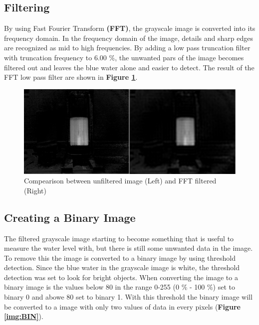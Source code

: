 \subsection{Filtering}
By using Fast Fourier Transform \textbf{(FFT)}, the grayscale image is converted into its frequency domain. In the frequency domain of the image, details and sharp edges are recognized as mid to high frequencies. By adding a low pass truncation filter with truncation frequency to 6.00 \%, the unwanted pars of the image becomes filtered out and leaves the blue water alone and easier to detect. The result of the FFT low pass filter are shown in \textbf{Figure \ref{img:FFTS}}.

\begin{figure}[b!]
	\centering
	\includegraphics[width=1\textwidth]{pictures/FFTS}
	\caption{Compearison between unfiltered image (Left) and FFT filtered (Right)}
	\label{img:FFTS}
\end{figure}


\subsection{Creating a Binary Image}
The filtered grayscale image starting to become something that is useful to measure the water level with, but there is still some unwanted data in the image. To remove this the image is converted to a binary image by using threshold detection. Since the blue water in the grayscale image is white, the threshold detection was set to look for bright objects. When converting the image to a binary image is the values below 80 in the range 0-255 (0 \% - 100 \%) set to binary 0 and abowe 80 set to binary 1. With this threshold the binary image will be converted to a image with only two values of data in every pixels (\textbf{Figure \ref{img:BIN}}).



